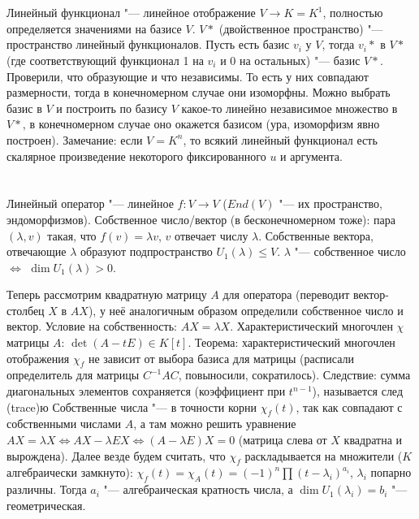 \section{} %
Линейный функционал "--- линейное отображение $V \to K = K^1$, полностью определяется значениями на базисе $V$.
$V*$ (двойственное пространство) "--- пространство линейный функционалов.
Пусть есть базис $v_i$ у $V$, тогда $v_i*$ в $V*$ (где соответствующий функционал 1 на $v_i$ и 0 на остальных) "--- базис $V*$.
Проверили, что образующие и что независимы.
То есть у них совпадают размерности, тогда в конечномерном случае они изоморфны.
Можно выбрать базис в $V$ и построить по базису $V$ какое-то линейно независимое множество в $V*$, в конечномерном случае оно окажется базисом (ура, изоморфизм явно построен).
Замечание: если $V=K^n$, то всякий линейный функционал есть скалярное произведение некоторого фиксированного $u$ и аргумента.

\section{} %
\TODO[2.13.1, страницы 57-58]

\section{} %
Линейный оператор "--- линейное $f \colon V \to V$ ($End(V)$ "--- их пространство, эндоморфизмов).
Собственное число/вектор (в бесконечномерном тоже): пара $(\lambda, v)$ такая, что $f(v)=\lambda v$, $v$ отвечает числу $\lambda$.
Собственные вектора, отвечающие $\lambda$ образуют подпространство $U_1(\lambda) \le V$.
$\lambda$ "--- собственное число $\iff$ $\dim U_1(\lambda) > 0$.

Теперь рассмотрим квадратную матрицу $A$ для оператора (переводит вектор-столбец $X$ в $AX$), у неё аналогичным образом определили собственное число и вектор.
Условие на собственность: $AX=\lambda X$.
Характеристический многочлен $\chi$ матрицы $A$: $\det (A - tE) \in K[t]$.
Теорема: характеристический многочлен отображения $\chi_f$ не зависит от выбора базиса для матрицы (расписали определитель для матрицы $C^{-1}AC$, повыносили, сократилось).
Следствие: сумма диагональных элементов сохраняется (коэффициент при $t^{n-1}$), называется след (trace)ю
Собственные числа "--- в точности корни $\chi_f(t)$, так как совпадают с собственными числами $A$, а там можно решить уравнение $AX =\lambda X \iff AX-\lambda EX \iff (A-\lambda E)X = 0$
(матрица слева от $X$ квадратна и вырождена).
Далее везде будем считать, что $\chi_f$ раскладывается на множители ($K$ алгебраически замкнуто):
$\chi_f(t) = \chi_A(t) = (-1)^n \prod (t - \lambda_i)^{a_i}$, $\lambda_i$ попарно различны.
Тогда $a_i$ "--- алгебраическая кратность числа, а $\dim U_1(\lambda_i) = b_i$ "--- геометрическая.


